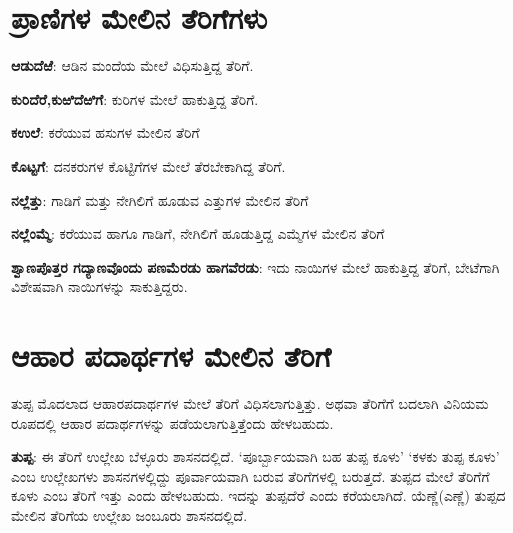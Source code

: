 \section*{ಪ್ರಾಣಿಗಳ ಮೇಲಿನ ತೆರಿಗೆಗಳು}

\textbf{ಆಡುದೆಱೆ}: ಆಡಿನ ಮಂದೆಯ ಮೇಲೆ ವಿಧಿಸುತ್ತಿದ್ದ ತೆರಿಗೆ.

\noindent
\textbf{ಕುರಿದೆರೆ,}\textbf{ಕುಱಿದೆಱಿಗೆ}: ಕುರಿಗಳ ಮೇಲೆ ಹಾಕುತ್ತಿದ್ದ ತೆರಿಗೆ.

\noindent
\textbf{ಕಉಲೆ}: ಕರೆಯುವ ಹಸುಗಳ ಮೇಲಿನ ತೆರಿಗೆ

\noindent
\textbf{ಕೊಟ್ಟಗೆ}: ದನಕರುಗಳ ಕೊಟ್ಟಿಗೆಗಳ ಮೇಲೆ ತೆರಬೇಕಾಗಿದ್ದ ತೆರಿಗೆ.

\noindent
\textbf{ನಲ್ಲೆತ್ತು}: ಗಾಡಿಗೆ ಮತ್ತು ನೇಗಿಲಿಗೆ ಹೂಡುವ ಎತ್ತುಗಳ ಮೇಲಿನ ತೆರಿಗೆ

\noindent
\textbf{ನಲ್ಲೆಂಮ್ಮೆ}: ಕರೆಯುವ ಹಾಗೂ ಗಾಡಿಗೆ, ನೇಗಿಲಿಗೆ ಹೂಡುತ್ತಿದ್ದ ಎಮ್ಮೆಗಳ ಮೇಲಿನ ತೆರಿಗೆ

\noindent
\textbf{ಶ್ವಾಣಪೊತ್ತರ ಗದ್ಯಾಣವೊಂದು ಪಣಮೆರಡು ಹಾಗವೆರಡು}: ಇದು ನಾಯಿಗಳ ಮೇಲೆ ಹಾಕುತ್ತಿದ್ದ ತೆರಿಗೆ, ಬೇಟೆಗಾಗಿ ವಿಶೇಷವಾಗಿ ನಾಯಿಗಳನ್ನು ಸಾಕುತ್ತಿದ್ದರು.

\section*{ಆಹಾರ ಪದಾರ್ಥಗಳ ಮೇಲಿನ ತೆರಿಗೆ}

ತುಪ್ಪ ಮೊದಲಾದ ಆಹಾರಪದಾರ್ಥಗಳ ಮೇಲೆ ತೆರಿಗೆ ವಿಧಿಸಲಾಗುತ್ತಿತ್ತು. ಅಥವಾ ತೆರಿಗೆಗೆ ಬದಲಾಗಿ ವಿನಿಯಮ ರೂಪದಲ್ಲಿ ಆಹಾರ ಪದಾರ್ಥಗಳನ್ನು ಪಡೆಯಲಾಗುತ್ತಿತ್ತೆಂದು ಹೇಳಬಹುದು.

\vskip 2pt

\textbf{ತುಪ್ಪ}: ಈ ತೆರಿಗೆ ಉಲ್ಲೇಖ ಬೆಳ್ಳೂರು ಶಾಸನದಲ್ಲಿದೆ. ‘ಪೂರ್ಬ್ಬಾಯವಾಗಿ ಬಹ ತುಪ್ಪ ಕೂಳು’ ‘ಕಳಕು ತುಪ್ಪ ಕೂಳು’ ಎಂಬ ಉಲ್ಲೇಖಗಳು ಶಾಸನಗಳಲ್ಲಿದ್ದು ಪೂರ್ವಾಯವಾಗಿ ಬರುವ ತೆರಿಗೆಗಳಲ್ಲಿ ಬರುತ್ತದೆ. ತುಪ್ಪದ ಮೇಲೆ ತೆರಿಗೆಗೆ ಕೂಳು ಎಂಬ ತೆರಿಗೆ ಇತ್ತು ಎಂದು ಹೇಳಬಹುದು. ಇದನ್ನು ತುಪ್ಪದೆರೆ ಎಂದು ಕರೆಯಲಾಗಿದೆ. ಯೆಣ್ಣೆ(ಎಣ್ಣೆ) ತುಪ್ಪದ ಮೇಲಿನ ತೆರಿಗೆಯ ಉಲ್ಲೇಖ ಜಂಬೂರು ಶಾಸನದಲ್ಲಿದೆ.

